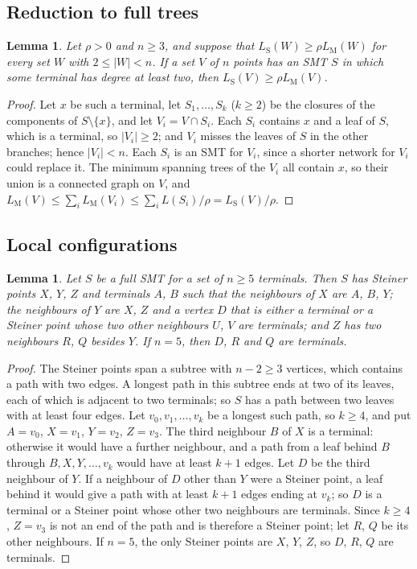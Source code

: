 \documentclass[11pt]{amsart}
\newtheorem{lemma}[theorem]{Lemma}
\theoremstyle{definition}
\theoremstyle{remark}
\numberwithin{equation}{section}
\newcommand{\LS}{L_{\mathrm S}}
\newcommand{\LM}{L_{\mathrm M}}
\begin{document}
\subsection{Reduction to full trees}

\begin{lemma}\label{lem:nonfull}
Let $\rho>0$ and $n\ge3$, and suppose that $\LS(W)\ge\rho\LM(W)$ for every set $W$ with $2\le|W|<n$. If a set $V$ of $n$ points has an SMT $S$ in which some terminal has degree at least two, then $\LS(V)\ge\rho\LM(V)$.
\end{lemma}

\begin{proof}
Let $x$ be such a terminal, let $S_1,\dots,S_k$ ($k\ge2$) be the closures of the components of $S\setminus\{x\}$, and let $V_i=V\cap S_i$. Each $S_i$ contains $x$ and a leaf of $S$, which is a terminal, so $|V_i|\ge2$; and $V_i$ misses the leaves of $S$ in the other branches; hence $|V_i|<n$. Each $S_i$ is an SMT for $V_i$, since a shorter network for $V_i$ could replace it. The minimum spanning trees of the $V_i$ all contain $x$, so their union is a connected graph on $V$, and $\LM(V)\le\sum_i\LM(V_i)\le\sum_iL(S_i)/\rho=\LS(V)/\rho$.
\end{proof}

\subsection{Local configurations}

\begin{lemma}\label{lem:local}
Let $S$ be a full SMT for a set of $n\ge5$ terminals. Then $S$ has Steiner points $X$, $Y$, $Z$ and terminals $A$, $B$ such that the neighbours of $X$ are $A$, $B$, $Y$; the neighbours of $Y$ are $X$, $Z$ and a vertex $D$ that is either a terminal or a Steiner point whose two other neighbours $U$, $V$ are terminals; and $Z$ has two neighbours $R$, $Q$ besides $Y$. If $n=5$, then $D$, $R$ and $Q$ are terminals.
\end{lemma}

\begin{proof}
The Steiner points span a subtree with $n-2\ge3$ vertices, which contains a path with two edges. A longest path in this subtree ends at two of its leaves, each of which is adjacent to two terminals; so $S$ has a path between two leaves with at least four edges. Let $v_0,v_1,\dots,v_k$ be a longest such path, so $k\ge4$, and put $A=v_0$, $X=v_1$, $Y=v_2$, $Z=v_3$. The third neighbour $B$ of $X$ is a terminal: otherwise it would have a further neighbour, and a path from a leaf behind $B$ through $B,X,Y,\dots,v_k$ would have at least $k+1$ edges. Let $D$ be the third neighbour of $Y$. If a neighbour of $D$ other than $Y$ were a Steiner point, a leaf behind it would give a path with at least $k+1$ edges ending at $v_k$; so $D$ is a terminal or a Steiner point whose other two neighbours are terminals. Since $k\ge4$, $Z=v_3$ is not an end of the path and is therefore a Steiner point; let $R$, $Q$ be its other neighbours. If $n=5$, the only Steiner points are $X$, $Y$, $Z$, so $D$, $R$, $Q$ are terminals.
\end{proof}
\end{document}
